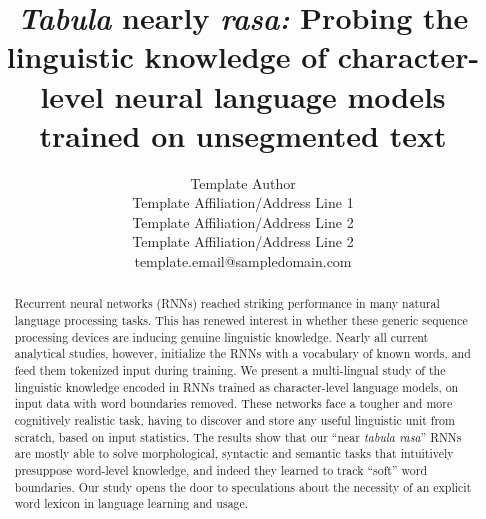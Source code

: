 \title{\emph{Tabula} nearly \emph{rasa:} Probing the linguistic knowledge of character-level neural language models trained on unsegmented text}


\author{
 Template Author \\
 Template Affiliation/Address Line 1 \\
 Template Affiliation/Address Line 2 \\
 Template Affiliation/Address Line 2 \\
  {\sf template.email@sampledomain.com} \\
}

\date{}


\maketitle
\begin{abstract}
  Recurrent neural networks (RNNs) reached striking performance in
  many natural language processing tasks. This has renewed interest in
  whether these generic sequence processing devices are inducing
  genuine linguistic knowledge. Nearly all current analytical studies,
  however, initialize the RNNs with a vocabulary of known words, and
  feed them tokenized input during training. We present a
  multi-lingual study of the linguistic knowledge encoded in RNNs
  trained as character-level language models, on input data with word
  boundaries removed. These networks face a tougher and more
  cognitively realistic task, having to discover and store any useful
  linguistic unit from scratch, based on input statistics. The results
  show that our ``near \emph{tabula rasa}'' RNNs are mostly able to
  solve morphological, syntactic and semantic tasks that intuitively
  presuppose word-level knowledge, and indeed they learned to track
  ``soft'' word boundaries. Our study opens the door to speculations
  about the necessity of an explicit word lexicon in language learning and
  usage.
\end{abstract}






